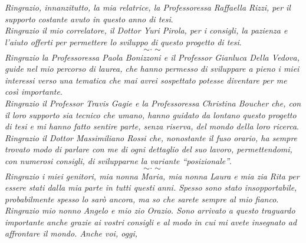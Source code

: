 \chapter*{}
\vspace{-3cm}

\thispagestyle{empty}

\begin{flushleft}
  \textit{Ringrazio, innanzitutto, la mia relatrice, la Professoressa Raffaella
    Rizzi, per il supporto costante avuto in questo anno di tesi}.\\
  \vspace{2mm}
  \textit{Ringrazio il mio correlatore, il Dottor Yuri Pirola, per i consigli,
    la pazienza e l'aiuto offerti per permettere lo sviluppo di questo progetto
    di tesi}.%
  \[\sim\cdot\sim\]
  \textit{Ringrazio la Professoressa Paola Bonizzoni e il Professor Gianluca
    Della Vedova, guide nel mio percorso di laurea, che hanno permesso
    di sviluppare a pieno i miei interessi verso una tematica che mai avrei
    sospettato potesse diventare per me così importante}.\\
  \vspace{2mm}
  \textit{Ringrazio il Professor Travis Gagie e la Professoressa Christina
    Boucher che, con il loro supporto 
    sia tecnico che umano, hanno guidato da lontano questo progetto di tesi e
    mi hanno fatto sentire parte, senza riserva, del mondo della loro
    ricerca}.\\ 
    \vspace{2mm}
    \textit{Ringrazio il Dottor Massimiliano Rossi che, nonostante il fuso
    orario, 
    ha sempre trovato modo di parlare con me di ogni dettaglio del suo
    lavoro, permettendomi, con numerosi consigli, di svilupparne la variante 
    ``posizionale''}.  
  \[\sim\cdot\sim\]
  \textit{Ringrazio i miei genitori, mia nonna Maria, mia nonna Laura e mia zia
    Rita per essere stati dalla mia parte in tutti questi anni. Spesso sono
    stato insopportabile, probabilmente spesso lo sarò ancora, ma so che sarete
    sempre al mio fianco}.\\
  \vspace{2mm}
  \textit{Ringrazio mio nonno Angelo e mio zio Orazio. Sono
    arrivato a questo traguardo importante anche grazie ai vostri consigli e al
    modo in cui mi avete insegnato ad affrontare il mondo. Anche voi, oggi,
}
\end{flushleft}

